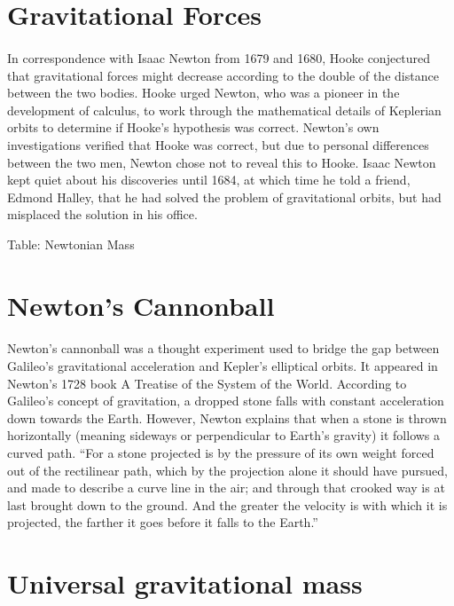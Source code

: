 \documentclass{book}
\begin{document}
	\section{Gravitational Forces}
	\paragraph{}
	In correspondence with Isaac Newton from 1679 and 1680, Hooke conjectured that gravitational forces might decrease according to the double of the distance between the two bodies. Hooke urged Newton, who was a pioneer in the development of calculus, to work through the mathematical details of Keplerian orbits to determine if Hooke's hypothesis was correct. Newton's own investigations verified that Hooke was correct, but due to personal differences between the two men, Newton chose not to reveal this to Hooke. Isaac Newton kept quiet about his discoveries until 1684, at which time he told a friend, Edmond Halley, that he had solved the problem of gravitational orbits, but had misplaced the solution in his office.
	
	Table: Newtonian Mass
	
	\section{Newton's Cannonball}
	\paragraph{}
	Newton's cannonball was a thought experiment used to bridge the gap between Galileo's gravitational acceleration and Kepler's elliptical orbits. It appeared in Newton's 1728 book A Treatise of the System of the World. According to Galileo's concept of gravitation, a dropped stone falls with constant acceleration down towards the Earth. However, Newton explains that when a stone is thrown horizontally (meaning sideways or perpendicular to Earth's gravity) it follows a curved path. ``For a stone projected is by the pressure of its own weight forced out of the rectilinear path, which by the projection alone it should have pursued, and made to describe a curve line in the air; and through that crooked way is at last brought down to the ground. And the greater the velocity is with which it is projected, the farther it goes before it falls to the Earth.''
	
	\section{Universal gravitational mass}
\end{document}
